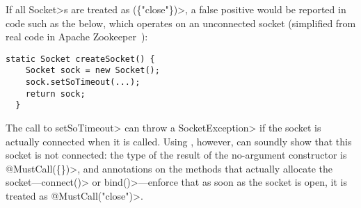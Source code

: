 If all \<Socket>s are treated as \MustCall\<(\{"close"\})>,
a false positive would be reported
in code such as the below, which operates on an unconnected socket
(simplified from real code in Apache Zookeeper~\cite{zookeeper-create-socket}):

\begin{lstlisting}[frame=tb,belowskip=3mm]
  static Socket createSocket() {
    Socket sock = new Socket();
    sock.setSoTimeout(...);
    return sock;
  }
\end{lstlisting}

\noindent
The call to \<setSoTimeout> can throw a \<SocketException> if the
socket is actually connected when it is called. Using \CreatesMustCallFor,
however, \tool can soundly show that this socket is not connected:
the type of the result of the no-argument constructor
is \<@MustCall(\{\})>, and \CreatesMustCallFor annotations
on the methods that actually allocate the socket---\<connect()> or
\<bind()>---enforce that as soon as the socket is open,
it is treated as \<@MustCall("close")>.

